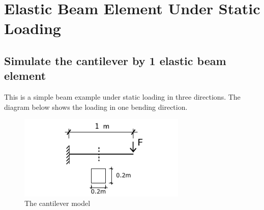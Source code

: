 \documentclass[fleqn,11pt]{article}
\begin{document}

\thispagestyle{fancy}


\tableofcontents{}





\newpage


\newpage
 \section{Elastic Beam Element Under Static Loading} 
 
 
 \subsection{Simulate the cantilever by 1 elastic beam element} 
 
 
 
This is a simple beam example under static loading in three directions. The diagram below shows the loading in one bending direction.

 \begin{figure}[!htb]
   \centering
   \includegraphics[width=8cm]{../Figure-files/_Chapter_Appendix_Illustrative_Examples/cantilever.pdf}
   \caption{The cantilever model}
   \label{fig-canti_1beam-static}
 \end{figure}
 
\end{document}
